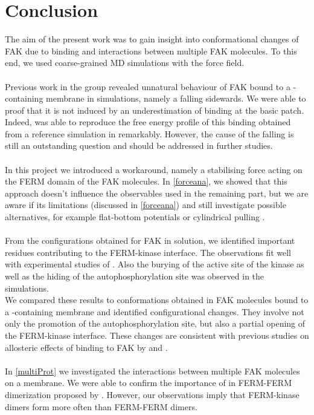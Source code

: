 \chapter{Conclusion}
The aim of the present work was to gain insight into conformational changes of FAK due to \pip{} binding and interactions between multiple FAK molecules. To this end, we used coarse-grained MD simulations with the \martini{} force field.\\
\\
Previous work in the group revealed unnatural behaviour of FAK bound to a \pip{}-containing membrane in \martini{} simulations, namely a falling sidewards. We were able to proof that it is not induced by an underestimation of \pip{} binding at the basic patch. Indeed, \martini{} was able to reproduce the free energy profile of this binding obtained from a reference simulation in \charmm{} remarkably. However, the cause of the falling is still an outstanding question and should be addressed in further studies.\\ %
\\
In this project we introduced a workaround, namely a stabilising force acting on the FERM domain of the FAK molecules. In \autoref{forceana}, we showed that this approach doesn't influence the observables used in the remaining part, but we are aware if its limitations (discussed in \autoref{forceana}) and still investigate possible alternatives, for example flat-bottom potentials or cylindrical pulling \autocite[p. 156-158]{gromacsManual}.\\
\\
From the configurations obtained for FAK in solution, we identified important residues contributing to the FERM-kinase interface. The observations fit well with experimental studies of \textcite{structFAK}. Also the burying of the active site of the kinase as well as the hiding of the autophosphorylation site was observed in the simulations.\\
We compared these results to conformations obtained in FAK molecules bound to a \pip{}-containing membrane and identified configurational changes. They involve not only the promotion of the autophosphorylation site, but also a partial opening of the FERM-kinase interface. These changes are consistent with previous studies on allosteric effects of \pip{} binding to FAK by \textcite{pap001} and \textcite{pap003}.\\
\\
In \autoref{multiProt} we investigated the interactions between multiple FAK molecules on a membrane. We were able to confirm the importance of  in FERM-FERM dimerization proposed by \textcite{fakdimers}. However, our observations imply that FERM-kinase dimers form more often than FERM-FERM dimers.\\
